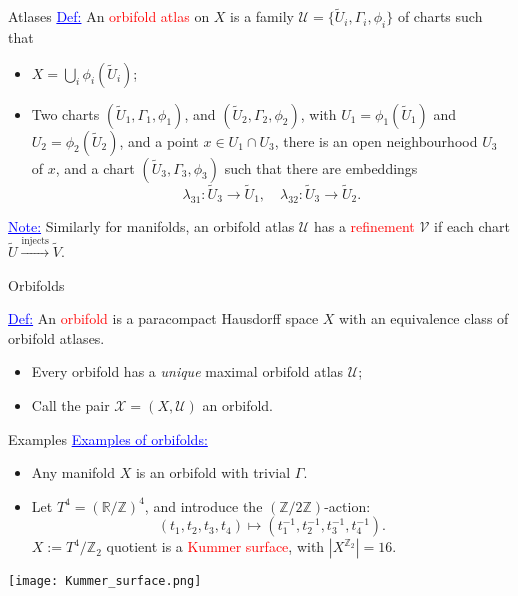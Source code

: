 \documentclass[aspectratio=169,xcolor=dvipsnames]{beamer}
\newcommand{\ra}{\rightarrow}
\newcommand{\ZZ}{\mathbb{Z}}
\newcommand{\RR}{\mathbb{R}}
\begin{document}
\begin{frame}{Atlases}
	\textcolor{blue}{\underline{Def:}} An \textcolor{red}{orbifold atlas} on $X$ is a family $\mathcal{U} = \{\widetilde{U}_{i}, \Gamma_{i}, \phi_{i}\}$ of charts such that
	\begin{itemize}
		\item $X = \bigcup_{i} \phi_{i}(\widetilde{U}_{i})$;
		\item Two charts $(\widetilde{U}_{1}, \Gamma_{1}, \phi_{1})$, and $(\widetilde{U}_{2}, \Gamma_{2}, \phi_{2})$, with $U_{1} = \phi_{1}(\widetilde{U}_{1})$ and $U_{2} = \phi_{2}(\widetilde{U}_{2})$, and a point $x \in U_{1} \cap U_{3}$, there is an open neighbourhood $U_{3}$ of $x$, and a chart $(\widetilde{U}_{3}, \Gamma_{3}, \phi_{3})$ such that there are embeddings
		\[
		\lambda_{31} : \widetilde{U}_{3} \ra \widetilde{U}_{1}, \quad \lambda_{32} : \widetilde{U}_{3} \ra \widetilde{U}_{2}.
		\]
	\end{itemize}
	\textcolor{blue}{\underline{Note:}} Similarly for manifolds, an orbifold atlas $\mathcal{U}$ has a \textcolor{red}{refinement} $\mathcal{V}$ if each chart $\widetilde{U} \overset{\text{injects}}{\longrightarrow} \widetilde{V}$.
\end{frame}

\begin{frame}{Orbifolds}
    
	\textcolor{blue}{\underline{Def:}} An \textcolor{red}{orbifold} is a paracompact Hausdorff space $X$ with an equivalence class of orbifold atlases.
	\begin{itemize}
		\item Every orbifold has a \emph{unique} maximal orbifold atlas $\mathcal{U}$;
		\item Call the pair $\mathcal{X} = (X, \mathcal{U})$ an orbifold.
	\end{itemize}
\end{frame}

\begin{frame}{Examples}
	\textcolor{blue}{\underline{Examples of orbifolds:}}
	\begin{itemize}
		\item Any manifold $X$ is an orbifold with trivial $\Gamma$.
		\item Let $T^{4} = (\RR/\ZZ)^{4}$, and introduce the $(\ZZ/2\ZZ)$-action:
		\[
		(t_{1}, t_{2}, t_{3}, t_{4}) \mapsto (t_{1}^{-1}, t_{2}^{-1}, t_{3}^{-1}, t_{4}^{-1}).
		\]
		$X := T^{4}/\ZZ_{2}$ quotient is a \textcolor{red}{Kummer surface}, with $|X^{\ZZ_{2}}| = 16$.
	\end{itemize}
    \texttt{[image: Kummer\_surface.png]}
\end{frame}
\end{document}
